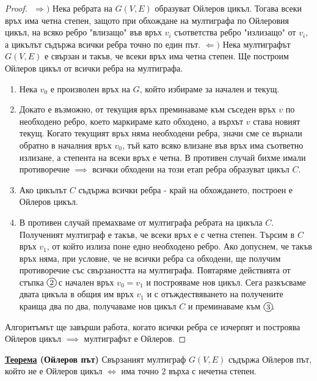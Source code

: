 \documentclass{article}
\begin{document}
\begin{proof}
    $ $ \newline  
    $\Rightarrow)$ Нека ребрата на $G(V, E)$ образуват Ойлеров цикъл. Тогава всеки връх има четна степен, защото при обхождане на мултиграфа
    по Ойлеровия цикъл, на всяко ребро "влизащо" във връх $v_i$ съответства ребро "излизащо" от $v_i$, а цикълът съдържа всички ребра точно по
    един път. \newline\newline
    $\Leftarrow)$ Нека мултиграфът $G(V, E)$ е свързан и такъв, че всеки връх има четна степен. Ще построим Ойлеров цикъл от всички ребра на
    мултиграфа.
    \begin{enumerate}[label=\protect\circled{\arabic*}]
        \item Нека $v_0$ е произволен връх на $G$, който избираме за начален и текущ.
        \item Докато е възможно, от текущия връх преминаваме към съседен връх $v$ по необходено ребро, което маркираме като
        обходено, а върхът $v$ става новият текущ. Когато текущият връх няма необходени ребра, значи сме се върнали обратно в
        началния връх $v_0$, тъй като всяко влизане във връх има съответно излизане, а степента на всеки връх е четна.
        В противен случай бихме имали противоречие $\implies$ всички обходени на този етап ребра образуват цикъл $C$.
        \item Ако цикълът $C$ съдържа всички ребра - край на обхождането, построен е Ойлеров цикъл.
        \item В противен случай премахваме от мултиграфа ребрата на цикъла $C$. Полученият мултиграф е такъв, че всеки връх е с четна степен.
        Търсим в $C$ връх $v_1$, от който излиза поне едно необходено ребро. Ако допуснем, че такъв връх няма, при условие, че не
        всички ребра са обходени, ще получим противоречие със свързаността на мултиграфа. Повтаряме действията от стъпка $\circled{2}$ с начален връх
        $v_0 = v_1$ и построяваме нов цикъл. Сега разкъсваме двата цикъла в общия им връх $v_1$ и с отъждествяването на получените краища два по два,
        получаваме нов цикъл $C$ и преминаваме към $\circled{3}$.
    \end{enumerate}
    Алгоритъмът ще завърши работа, когато всички ребра се изчерпят и построява Ойлеров цикъл $\implies$ мултиграфът е Ойлеров.
\end{proof}
\textbf{\underline{Теорема} (Ойлеров път)} \newline
Свързаният мултиграф $G(V, E)$ съдържа Ойлеров път, който не е Ойлеров цикъл $\iff$ има точно $2$ върха с нечетна степен.
\end{document}
